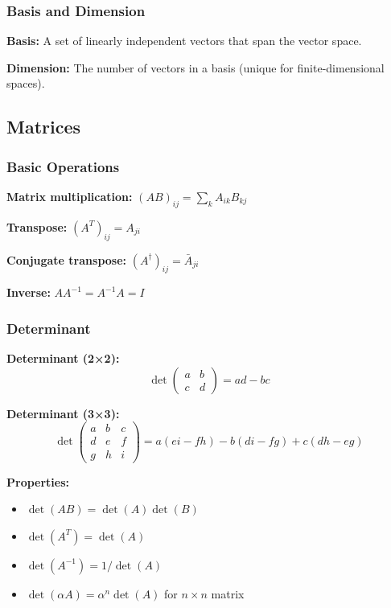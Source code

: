 \documentclass[12pt,a4paper]{article}
\begin{document}
\subsubsection{Basis and Dimension}
\begin{formulabox}
\textbf{Basis:} A set of linearly independent vectors that span the vector space.

\textbf{Dimension:} The number of vectors in a basis (unique for finite-dimensional spaces).
\end{formulabox}

\subsection{Matrices}
\subsubsection{Basic Operations}
\begin{formulabox}
\textbf{Matrix multiplication:} $(AB)_{ij} = \sum_k A_{ik} B_{kj}$

\textbf{Transpose:} $(A^T)_{ij} = A_{ji}$

\textbf{Conjugate transpose:} $(A^\dagger)_{ij} = \bar{A}_{ji}$

\textbf{Inverse:} $AA^{-1} = A^{-1}A = I$
\end{formulabox}

\subsubsection{Determinant}
\begin{formulabox}
\textbf{Determinant (2×2):}
\begin{equation}
\det\begin{pmatrix} a & b \\ c & d \end{pmatrix} = ad - bc
\end{equation}

\textbf{Determinant (3×3):}
\begin{equation}
\det\begin{pmatrix} a & b & c \\ d & e & f \\ g & h & i \end{pmatrix} = a(ei - fh) - b(di - fg) + c(dh - eg)
\end{equation}

\textbf{Properties:}
\begin{itemize}
    \item $\det(AB) = \det(A)\det(B)$
    \item $\det(A^T) = \det(A)$
    \item $\det(A^{-1}) = 1/\det(A)$
    \item $\det(\alpha A) = \alpha^n \det(A)$ for $n \times n$ matrix
\end{itemize}
\end{formulabox}
\end{document}
